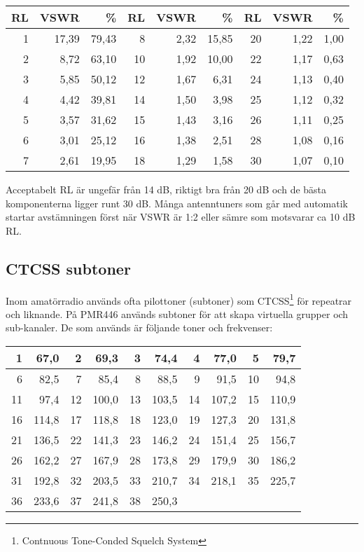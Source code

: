 \begin{longtable}{rrr|rrr|rrr}
	\textbf{RL} & \textbf{VSWR} & \textbf{\%} & \textbf{RL} & \textbf{VSWR} & \textbf{\%} & \textbf{RL} & \textbf{VSWR} & \textbf{\%} \\ \hline 	\endhead
	          1 &         17,39 &       79,43 &           8 &          2,32 &       15,85 &          20 &          1,22 &        1,00 \\
	          2 &          8,72 &       63,10 &          10 &          1,92 &       10,00 &          22 &          1,17 &        0,63 \\
	          3 &          5,85 &       50,12 &          12 &          1,67 &        6,31 &          24 &          1,13 &        0,40 \\
	          4 &          4,42 &       39,81 &          14 &          1,50 &        3,98 &          25 &          1,12 &        0,32 \\
	          5 &          3,57 &       31,62 &          15 &          1,43 &        3,16 &          26 &          1,11 &        0,25 \\
	          6 &          3,01 &       25,12 &          16 &          1,38 &        2,51 &          28 &          1,08 &        0,16 \\
	          7 &          2,61 &       19,95 &          18 &          1,29 &        1,58 &          30 &          1,07 &        0,10
\end{longtable}

Acceptabelt RL är ungefär från 14 dB, riktigt bra från 20 dB och de bästa komponenterna ligger runt 30 dB. Många antenntuners som går med automatik startar avstämningen först när VSWR är 1:2 eller sämre som motsvarar ca 10 dB RL.

\subsection{CTCSS subtoner}

Inom amatörradio används ofta pilottoner (subtoner) som CTCSS\footnote{Contnuous Tone-Conded Squelch System} för repeatrar och liknande. På PMR446 används subtoner för att skapa virtuella grupper och sub-kanaler. De som används är följande toner och frekvenser:

\begin{tabular}{rr|rr|rr|rr|rr}
	 1 &  67,0 &  2 &  69,3 &  3 &  74,4 &  4 &  77,0 &  5 &  79,7 \\ \hline
	 6 &  82,5 &  7 &  85,4 &  8 &  88,5 &  9 &  91,5 & 10 &  94,8 \\ \hline
	11 &  97,4 & 12 & 100,0 & 13 & 103,5 & 14 & 107,2 & 15 & 110,9 \\ \hline
	16 & 114,8 & 17 & 118,8 & 18 & 123,0 & 19 & 127,3 & 20 & 131,8 \\ \hline
	21 & 136,5 & 22 & 141,3 & 23 & 146,2 & 24 & 151,4 & 25 & 156,7 \\ \hline
	26 & 162,2 & 27 & 167,9 & 28 & 173,8 & 29 & 179,9 & 30 & 186,2 \\ \hline
	31 & 192,8 & 32 & 203,5 & 33 & 210,7 & 34 & 218,1 & 35 & 225,7 \\ \hline
	36 & 233,6 & 37 & 241,8 & 38 & 250,3 &    &       &    &
\end{tabular}


